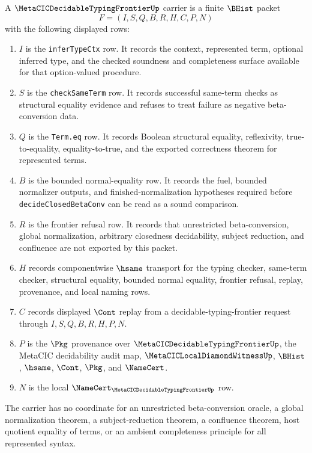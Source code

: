 \begin{definition}
\label{def:metacic-decidable-typing-frontier-carrier}
A $\MetaCICDecidableTypingFrontierUp$ carrier is a finite $\BHist$ packet
$$
F=(I,S,Q,B,R,H,C,P,N)
$$
with the following displayed rows:
\begin{enumerate}
\item $I$ is the \texttt{inferTypeCtx} row. It records the context, represented term, optional inferred type, and the checked soundness and completeness surface available for that option-valued procedure.
\item $S$ is the \texttt{checkSameTerm} row. It records successful same-term checks as structural equality evidence and refuses to treat failure as negative beta-conversion data.
\item $Q$ is the \texttt{Term.eq} row. It records Boolean structural equality, reflexivity, true-to-equality, equality-to-true, and the exported correctness theorem for represented terms.
\item $B$ is the bounded normal-equality row. It records the fuel, bounded normalizer outputs, and finished-normalization hypotheses required before \texttt{decideClosedBetaConv} can be read as a sound comparison.
\item $R$ is the frontier refusal row. It records that unrestricted beta-conversion, global normalization, arbitrary closedness decidability, subject reduction, and confluence are not exported by this packet.
\item $H$ records componentwise $\hsame$ transport for the typing checker, same-term checker, structural equality, bounded normal equality, frontier refusal, replay, provenance, and local naming rows.
\item $C$ records displayed $\Cont$ replay from a decidable-typing-frontier request through $I,S,Q,B,R,H,P,N$.
\item $P$ is the $\Pkg$ provenance over $\MetaCICDecidableTypingFrontierUp$, the MetaCIC decidability audit map, $\MetaCICLocalDiamondWitnessUp$, $\BHist$, $\hsame$, $\Cont$, $\Pkg$, and $\NameCert$.
\item $N$ is the local $\NameCert_{\MetaCICDecidableTypingFrontierUp}$ row.
\end{enumerate}
The carrier has no coordinate for an unrestricted beta-conversion oracle, a global normalization theorem, a subject-reduction theorem, a confluence theorem, host quotient equality of terms, or an ambient completeness principle for all represented syntax.
\end{definition}

